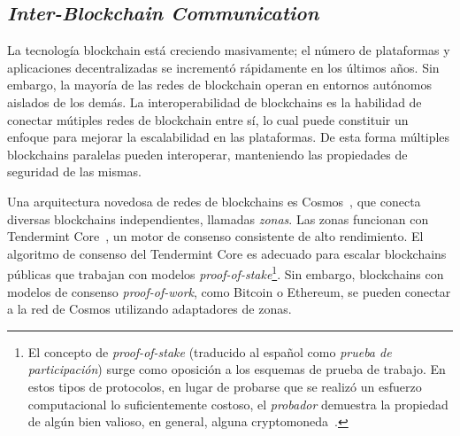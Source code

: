 
\subsection{\emph{Inter-Blockchain Communication}}
La tecnología blockchain está creciendo masivamente; el número de plataformas y
aplicaciones decentralizadas se incrementó rápidamente en los últimos años.
%
Sin embargo, la mayoría de las redes de blockchain operan en entornos autónomos aislados
de los demás.
%
La interoperabilidad de blockchains es la habilidad de conectar mútiples redes de
blockchain entre sí, lo cual puede constituir un enfoque para mejorar la escalabilidad en
las plataformas.
%
De esta forma múltiples blockchains paralelas pueden interoperar, manteniendo las
propiedades de seguridad de las mismas.

Una arquitectura novedosa de redes de blockchains es Cosmos~\cite{cosmos}, que conecta diversas
blockchains independientes, llamadas \emph{zonas}.
%
Las zonas funcionan con Tendermint Core~\cite{Buchman.2018.Tendermint}, un motor de consenso consistente de alto rendimiento.
%
El algoritmo de consenso del Tendermint Core es adecuado para escalar blockchains públicas que
trabajan con modelos \emph{proof-of-stake}\footnote{El concepto de \emph{proof-of-stake} (traducido al español
como \emph{prueba de participación}) surge como oposición a los esquemas de prueba de trabajo.
En estos tipos de protocolos, en lugar de probarse que se realizó un esfuerzo computacional lo suficientemente
costoso, el \emph{probador} demuestra la propiedad de algún bien valioso, en general, alguna cryptomoneda~\cite{King2012PPCoinPC}.}.
%
Sin embargo, blockchains con modelos de consenso \emph{proof-of-work}, como Bitcoin o Ethereum,
se pueden conectar a la red de Cosmos utilizando adaptadores de zonas.


